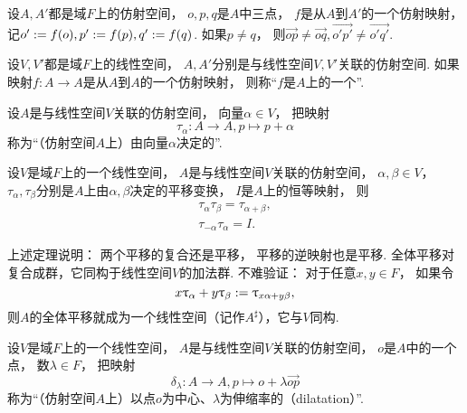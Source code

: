 \begin{corollary}
设\(A,A'\)都是域\(F\)上的仿射空间，
\(o,p,q\)是\(A\)中三点，
\(f\)是从\(A\)到\(A'\)的一个仿射映射，
记\(o' := f(o), p' := f(p), q' := f(q)\).
如果\(p \neq q\)，
则\(
	\vec{op} \neq \vec{oq},
	\vec{o'p'} \neq \vec{o'q'}
\).
\end{corollary}

\begin{definition}
设\(V,V'\)都是域\(F\)上的线性空间，
\(A,A'\)分别是与线性空间\(V,V'\)关联的仿射空间.
如果映射\(f\colon A \to A\)是从\(A\)到\(A\)的一个仿射映射，
则称“\(f\)是\(A\)上的一个”.
\end{definition}

\begin{definition}%
设\(A\)是与线性空间\(V\)关联的仿射空间，
向量\(\alpha \in V\)，
把映射\begin{equation*}
	\tau_\alpha\colon A \to A,
	p \mapsto p + \alpha
\end{equation*}
称为“（仿射空间\(A\)上）由向量\(\alpha\)决定的”.
\end{definition}

\begin{theorem}%
设\(V\)是域\(F\)上的一个线性空间，
\(A\)是与线性空间\(V\)关联的仿射空间，
\(\alpha,\beta \in V\)，
\(\tau_\alpha,\tau_\beta\)分别是\(A\)上由\(\alpha,\beta\)决定的平移变换，
\(I\)是\(A\)上的恒等映射，
则\begin{gather*}
	\tau_\alpha \tau_\beta = \tau_{\alpha + \beta}, \\
	\tau_{-\alpha} \tau_\alpha = I.
\end{gather*}
\end{theorem}
\begin{remark}
上述定理说明：
两个平移的复合还是平移，
平移的逆映射也是平移.
全体平移对复合成群，它同构于线性空间\(V\)的加法群.
不难验证：
对于任意\(x,y \in F\)，
如果令\begin{equation*}
	x \uptau_\alpha + y \uptau_\beta
	:= \uptau_{x \alpha + y \beta},
\end{equation*}
则\(A\)的全体平移就成为一个线性空间（记作\(A^\sharp\)），它与\(V\)同构.
\end{remark}

\begin{definition}%
设\(V\)是域\(F\)上的一个线性空间，
\(A\)是与线性空间\(V\)关联的仿射空间，
\(o\)是\(A\)中的一个点，
数\(\lambda \in F\)，
把映射\begin{equation*}
	\delta_\lambda\colon A \to A,
	p \mapsto o + \lambda\vec{op}
\end{equation*}
称为“（仿射空间\(A\)上）以点\(o\)为中心、\(\lambda\)为伸缩率的（dilatation）”.
\end{definition}

